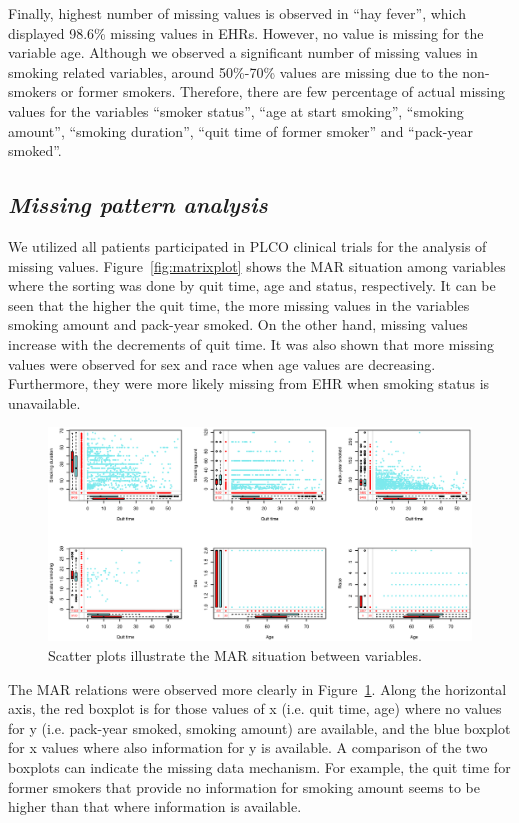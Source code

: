 \documentclass{amia}
\begin{document}
Finally, highest number of missing values is observed in ``hay fever'', which displayed 98.6\% missing values in EHRs. However, no value is missing for the variable age. Although we observed a significant number of missing values in smoking related variables, around 50\%-70\% values are missing due to the non-smokers or former smokers. Therefore, there are few percentage of actual missing values for the variables ``smoker status'', ``age at start smoking'', ``smoking amount'', ``smoking duration'', ``quit time of former smoker'' and ``pack-year smoked''. 

\subsection*{\textit{Missing pattern analysis}}
We utilized all patients participated in PLCO clinical trials for the analysis of missing values. Figure~\ref{fig:matrixplot} shows the MAR situation among variables where the sorting was done by quit time, age and status, respectively. It can be seen that the higher the quit time, the more missing values in the variables smoking amount and pack-year smoked. On the other hand, missing values increase with the decrements of quit time. It was also shown that more missing values were observed for sex and race when age values are decreasing. Furthermore, they were more likely missing from EHR when smoking status is unavailable.   

\begin{figure}[h!]
\centering
\includegraphics[width=1.0\textwidth]{figures/marginplot.eps}
\caption{Scatter plots illustrate the MAR situation between variables.}
\label{fig:marginplot}
\end{figure}

The MAR relations were observed more clearly in Figure~\ref{fig:marginplot}. Along the horizontal axis, the red boxplot is for those values of x (i.e. quit time, age) where no values for y (i.e. pack-year smoked, smoking amount) are available, and the blue boxplot for x values where also information for y is available. A comparison of the two boxplots can indicate the missing data mechanism. For example, the quit time for former smokers that provide no information for smoking amount seems to be higher than that where information is available. 
\end{document}
